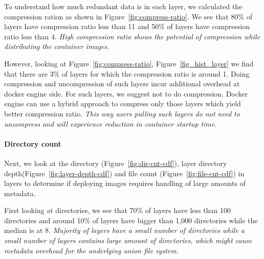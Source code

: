 To understand how much redundant data is in each layer, we calculated the
compression ration as shown in Figure~\ref{fig:compress-ratio}.
%
We see that 80\% of layers have compression ratio less than 11 and 50\% of
layers have compression ratio less than 4.
%
\emph{High compression ratio shows the potential of compression while
distributing the container images.}

However, looking at Figure~\ref{fig:compress-ratio},
Figure~\ref{fig_hist_layer} we find that there are 3\% of layers for which the
compression ratio is around 1.
%
Doing compression and uncompression of such layers incur additional overhead at
docker engine side.
%
For such layers, we suggest not to do compression.
%
Docker engine can use a hybrid approach to compress only those layers which
yield better compression ratio.
%
\emph{This way users pulling such layers do not need to uncompress and will
experience reduction in container startup time.}



\paragraph{Directory count}



Next, we look at the directory (Figure~\ref{fig:dir-cnt-cdf}), layer directory
depth(Figure~\ref{fig:layer-depth-cdf}) and file count
(Figure~\ref{fig:file-cnt-cdf}) in layers to determine if deploying images
requires handling of large amounts of metadata.

First looking at directories, we see that
70\% of layers have less than 100 directories and around 10\% of layers have
bigger than 1,000 directories while the median is at 8.
%
\emph{Majority of layers have a small number of directories while a small
number of layers contains large amount of directories, which might cause
metadata overhead for the underlying union file system.}

